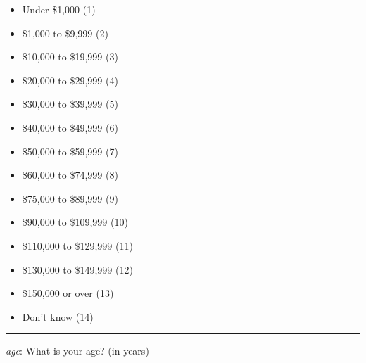 \begin{singlespace}
\begin{itemize}
\tightlist
\item
  Under \$1,000 (1)
\item
  \$1,000 to \$9,999 (2)
\item
  \$10,000 to \$19,999 (3)
\item
  \$20,000 to \$29,999 (4)
\item
  \$30,000 to \$39,999 (5)
\item
  \$40,000 to \$49,999 (6)
\item
  \$50,000 to \$59,999 (7)
\item
  \$60,000 to \$74,999 (8)
\item
  \$75,000 to \$89,999 (9)
\item
  \$90,000 to \$109,999 (10)
\item
  \$110,000 to \$129,999 (11)
\item
  \$130,000 to \$149,999 (12)
\item
  \$150,000 or over (13)
\item
  Don't know (14)
\end{itemize}

\begin{center}\rule{0.5\linewidth}{0.5pt}\end{center}

\emph{age}: What is your age? (in years)

\end{singlespace}